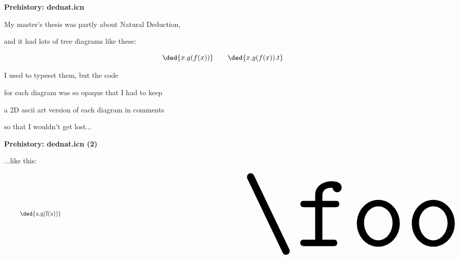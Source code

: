 \documentclass[oneside]{book}
\begin{document}



\newpage

\noedrxfooter


%                                                      

{\bf Prehistory: dednat.icn}

My master's thesis was partly about Natural Deduction,

and it had lots of tree diagrams like these:

%
\pu
$$\ded{x.g(f(x))} \qquad \ded{x.g(f(x)).t}$$

I used  to typeset them, but the code

for each diagram was so opaque that I had to keep

a 2D ascii art version of each diagram in comments

so that I wouldn't get lost...


\newpage


{\bf Prehistory: dednat.icn (2)}

...like this:

\msk



\pu

$\quad
 \vcenter{\ded{x.g(f(x))}}
 \qquad
 \vcenter{\resizebox{!}{120pt}{\foo}}
$


\newpage
\end{document}
